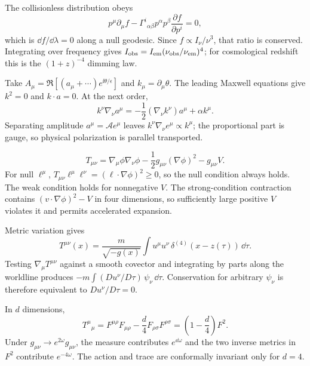 \begin{solution}
The collisionless distribution obeys
\[
p^\mu\partial_\mu f
-\Gamma^i{}_{\alpha\beta}p^\alpha p^\beta
\frac{\partial f}{\partial p^i}=0,
\]
which is \(\dd f/\dd\lambda=0\) along a null geodesic.  Since
\(f\propto I_\nu/\nu^3\), that ratio is conserved.  Integrating over
frequency gives \(I_{\rm obs}=I_{\rm em}(\nu_{\rm obs}/\nu_{\rm em})^4\);
for cosmological redshift this is the \((1+z)^{-4}\) dimming law.
\end{solution}

\begin{solution}
Take
\(A_\mu=\Re[(a_\mu+\cdots)e^{\ii\theta/\epsilon}]\) and
\(k_\mu=\partial_\mu\theta\).  The leading Maxwell equations give
\(k^2=0\) and \(k\cdot a=0\).  At the next order,
\[
k^\nu\nabla_\nu a^\mu
=-\frac12(\nabla_\nu k^\nu)a^\mu+\alpha k^\mu.
\]
Separating amplitude \(a^\mu=\mathcal A e^\mu\) leaves
\(k^\nu\nabla_\nu e^\mu\propto k^\mu\); the proportional part is gauge, so
physical polarization is parallel transported.
\end{solution}

\begin{solution}
\[
T_{\mu\nu}
=\nabla_\mu\phi\nabla_\nu\phi
-\frac12g_{\mu\nu}(\nabla\phi)^2-g_{\mu\nu}V.
\]
For null \(\ell^\mu\),
\(T_{\mu\nu}\ell^\mu\ell^\nu=(\ell\cdot\nabla\phi)^2\geq0\), so the null
condition always holds.  The weak condition holds for nonnegative \(V\).
The strong-condition contraction contains
\((v\cdot\nabla\phi)^2-V\) in four dimensions, so sufficiently large positive
\(V\) violates it and permits accelerated expansion.
\end{solution}

\begin{solution}
Metric variation gives
\[
T^{\mu\nu}(x)
=\frac{m}{\sqrt{-g(x)}}\int
u^\mu u^\nu\,\delta^{(4)}(x-z(\tau))\,\dd\tau.
\]
Testing \(\nabla_\mu T^{\mu\nu}\) against a smooth covector and integrating by
parts along the worldline produces
\(-m\int (Du^\nu/D\tau)\,\psi_\nu\,\dd\tau\).  Conservation for arbitrary
\(\psi_\nu\) is therefore equivalent to \(Du^\nu/D\tau=0\).
\end{solution}

\begin{solution}
In \(d\) dimensions,
\[
T^\mu{}_\mu
=F^{\mu\rho}F_{\mu\rho}
-\frac d4F_{\rho\sigma}F^{\rho\sigma}
=\left(1-\frac d4\right)F^2.
\]
Under \(g_{\mu\nu}\to e^{2\omega}g_{\mu\nu}\), the measure contributes
\(e^{\dd\omega}\) and the two inverse metrics in \(F^2\) contribute
\(e^{-4\omega}\).  The action and trace are conformally invariant only for
\(d=4\).
\end{solution}
